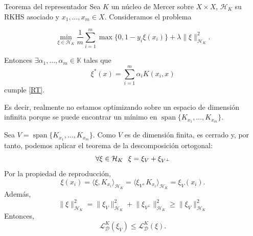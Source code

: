 \documentclass{beamer}
\makeatletter
\renewenvironment{proof}[1][\proofname]{%
  \par\pushQED{\qed}%
  \normalfont
  \topsep6\p@\@plus6\p@\relax
  \trivlist
  \item[\hskip\labelsep\itshape #1\@addpunct{.}]
}{%
  \popQED\endtrivlist\@endpefalse
}
\makeatother
\begin{document}
\begin{frame}

\begin{block} {Teorema del representador}
    Sea \(K\) un núcleo de Mercer sobre \(X \times X\), \(\mathcal{H}_K\) su RKHS asociado y \(x_1, \dots, x_m \in X\). Consideramos el problema
    
    \begin{equation}\label{RT}
        \min_{\xi\in\mathcal{H}_K} \frac{1}{m} \sum_{i=1}^m \max\{0,1-y_i\xi(x_i)\} + \lambda \lVert \xi \rVert_{\mathcal{H}_K}^2.
    \end{equation}
    
    Entonces \(\exists \alpha_1, \dots, \alpha_m \in \mathbb{K}\) tales que
    \[
    \xi^\ast(x) = \sum_{i=1}^m \alpha_i K(x_i,x)
    \]
    cumple \eqref{RT}.
\end{block}

\vspace{0.1in}

Es decir, realmente no estamos optimizando sobre un espacio de dimensión infinita porque se puede encontrar un mínimo en \(\operatorname{span}\{K_{x_1}, \dots, K_{x_m}\}\).
    
\end{frame}

\begin{frame}
    \begin{proof}
        Sea \(V = \operatorname{span}\{K_{x_1}, \dots, K_{x_m}\}\). Como \(V\) es de dimensión finita, es cerrado y, por tanto, podemos aplicar el teorema de la descomposición ortogonal:
        \[
        \forall \xi \in \mathcal{H}_K \hspace{0.1in} \xi = \xi_V + \xi_{V^\perp}
        \]
        Por la propiedad de reproducción,
        \[
        \xi(x_i) = \langle \xi,K_{x_i} \rangle_{\mathcal{H}_K} = \langle \xi_V,K_{x_i} \rangle_{\mathcal{H}_K} = \xi_V(x_i).
        \]
        Además,
        \[
        \lVert \xi \rVert_{\mathcal{H}_K}^2 = \lVert \xi_V \rVert_{\mathcal{H}_K}^2 + \lVert \xi_{V^\perp} \rVert_{\mathcal{H}_K}^2 \geq \lVert \xi_V \rVert_{\mathcal{H}_K}^2 
        \]
        Entonces,
        \[
        \mathscr{L}_{\mathcal{D}}^K(\xi_V) \leq \mathscr{L}_{\mathcal{D}}^K(\xi).
        \]
    \end{proof}
\end{frame}
\end{document}
